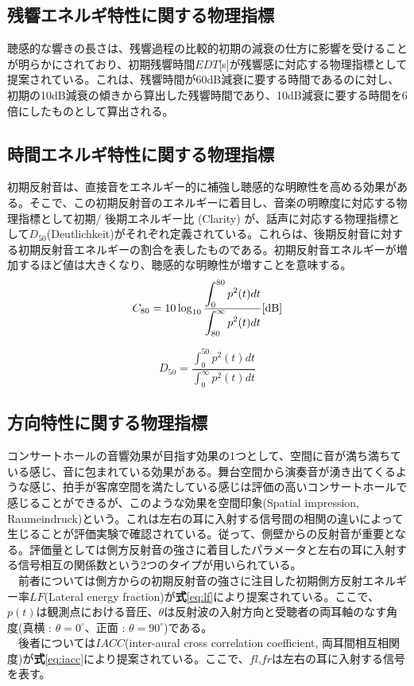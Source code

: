 \subsection{残響エネルギ特性に関する物理指標}
聴感的な響きの長さは、残響過程の比較的初期の減衰の仕方に影響を受けることが明らかにされており、初期残響時間$EDT$[s]が残響感に対応する物理指標として提案されている。これは、残響時間が60dB減衰に要する時間であるのに対し、初期の10dB減衰の傾きから算出した残響時間であり、10dB減衰に要する時間を6倍にしたものとして算出される。

\subsection{時間エネルギ特性に関する物理指標}
初期反射音は、直接音をエネルギー的に補強し聴感的な明瞭性を高める効果がある。そこで、この初期反射音のエネルギーに着目し、音楽の明瞭度に対応する物理指標として初期/ 後期エネルギー比 \Clarity(Clarity) が、話声に対応する物理指標として$D_{50}$(Deutlichkeit)がそれぞれ定義されている。これらは、後期反射音に対する初期反射音エネルギーの割合を表したものである。初期反射音エネルギーが増加するほど値は大きくなり、聴感的な明瞭性が増すことを意味する。
\begin{equation}
    \label{eq:c80}
  C_{80} = 10\log_{10}{\frac{\displaystyle\int_0^{80}p^2(t)dt}{\displaystyle\int_{80}^{\infty}p^2(t)dt}} \textrm{[dB]}
\end{equation}

\begin{equation}
    \label{eq:c80}
  D_{50} = {\frac{\displaystyle\int_0^{50}p^2(t)dt}{\displaystyle\int_0^{\infty}p^2(t)dt}} 
\end{equation}

\subsection{方向特性に関する物理指標}
コンサートホールの音響効果が目指す効果の1つとして、空間に音が満ち満ちている感じ、音に包まれている効果がある。舞台空間から演奏音が湧き出てくるような感じ、拍手が客席空間を満たしている感じは評価の高いコンサートホールで感じることができるが、このような効果を空間印象(Spatial impression, Raumeindruck)という。これは左右の耳に入射する信号間の相関の違いによって生じることが評価実験で確認されている。従って、側壁からの反射音が重要となる。評価量としては側方反射音の強さに着目したパラメータと左右の耳に入射する信号相互の関係数という2つのタイプが用いられている。
\\　前者については側方からの初期反射音の強さに注目した初期側方反射エネルギー率$LF$(Lateral energy fraction)が\textbf{式}\ref{eq:lf}により提案されている。ここで、$p(t)$は観測点における音圧、$\theta$は反射波の入射方向と受聴者の両耳軸のなす角度(真横 : $\theta = 0^\circ$、正面 : $\theta = 90^\circ$)である。
\\　後者については$IACC$(inter-aural cross correlation coefficient, 両耳間相互相関度)が\textbf{式}\ref{eq:iacc}により提案されている。ここで、$fl$,$fr$は左右の耳に入射する信号を表す。

